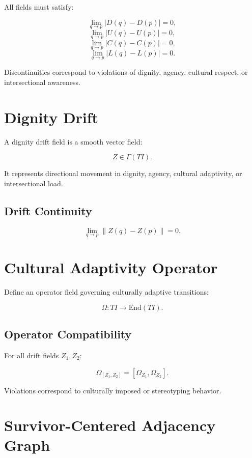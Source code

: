 \documentclass[11pt]{article}
\begin{document}
All fields must satisfy:

\[
\lim_{q \to p} |D(q) - D(p)| = 0,
\]
\[
\lim_{q \to p} |U(q) - U(p)| = 0,
\]
\[
\lim_{q \to p} |C(q) - C(p)| = 0,
\]
\[
\lim_{q \to p} |L(q) - L(p)| = 0.
\]

Discontinuities correspond to violations of dignity, agency, cultural respect,
or intersectional awareness.

\section{Dignity Drift}

A dignity drift field is a smooth vector field:

\[
Z \in \Gamma(TI).
\]

It represents directional movement in dignity, agency, cultural adaptivity, or
intersectional load.

\subsection{Drift Continuity}

\[
\lim_{q \to p} \|Z(q) - Z(p)\| = 0.
\]

\section{Cultural Adaptivity Operator}

Define an operator field governing culturally adaptive transitions:

\[
\Omega : TI \to \mathrm{End}(TI).
\]

\subsection{Operator Compatibility}

For all drift fields $Z_1, Z_2$:

\[
\Omega_{[Z_1, Z_2]} = [\Omega_{Z_1}, \Omega_{Z_2}].
\]

Violations correspond to culturally imposed or stereotyping behavior.

\section{Survivor-Centered Adjacency Graph}
\end{document}
